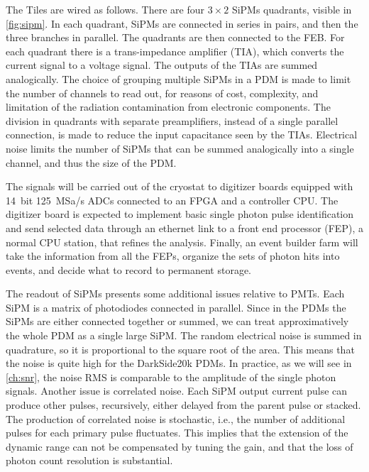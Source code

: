 
The Tiles are wired as follows. There are four $3\times 2$ SiPMs quadrants,
visible in \autoref{fig:sipm}. In each quadrant, SiPMs are connected in series
in pairs, and then the three branches in parallel. The quadrants are then
connected to the FEB. For each quadrant there is a trans-impedance amplifier
(TIA), which converts the current signal to a voltage signal. The outputs of
the TIAs are summed analogically. The choice of grouping multiple SiPMs in a
PDM is made to limit the number of channels to read out, for reasons of cost,
complexity, and limitation of the radiation contamination from electronic
components. The division in quadrants with separate preamplifiers, instead of a
single parallel connection, is made to reduce the input capacitance seen by the
TIAs. Electrical noise limits the number of SiPMs that can be summed
analogically into a single channel, and thus the size of the PDM.

The signals will be carried out of the cryostat to digitizer boards equipped
with 14~bit \SI{125}{MSa/s} ADCs connected to an FPGA and a controller CPU. The
digitizer board is expected to implement basic single photon pulse
identification and send selected data through an ethernet link to a front end
processor (FEP), a normal CPU station, that refines the analysis. Finally, an
event builder farm will take the information from all the FEPs, organize the
sets of photon hits into events, and decide what to record to permanent
storage.

The readout of SiPMs presents some additional issues relative to PMTs. Each
SiPM is a matrix of photodiodes connected in parallel. Since in the PDMs the
SiPMs are either connected together or summed, we can treat approximatively the
whole PDM as a single large SiPM. The random electrical noise is summed in
quadrature, so it is proportional to the square root of the area. This means
that the noise is quite high for the DarkSide20k PDMs. In practice, as we will
see in \autoref{ch:snr}, the noise RMS is comparable to the amplitude of the
single photon signals. Another issue is correlated noise. Each SiPM output
current pulse can produce other pulses, recursively, either delayed from the
parent pulse or stacked. The production of correlated noise is stochastic,
i.e., the number of additional pulses for each primary pulse fluctuates. This
implies that the extension of the dynamic range can not be compensated by
tuning the gain, and that the loss of photon count resolution is substantial.

